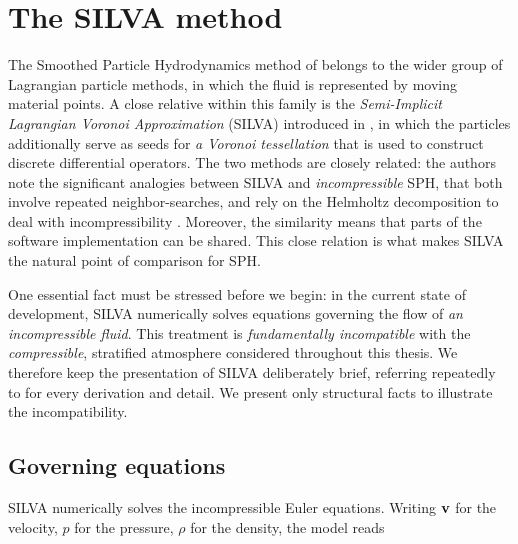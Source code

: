 \documentclass[../main.tex]{subfiles}
\begin{document}
\chapter{The SILVA method}
\label{chap:SILVA}

The Smoothed Particle Hydrodynamics method of  belongs to the wider group of Lagrangian particle methods, in which the fluid is represented by moving material points. A close relative within this family is the \emph{Semi-Implicit Lagrangian Voronoi Approximation} (SILVA) introduced in \autocite{kinclSemiimplicitLagrangianVoronoi2025}, in which the particles additionally serve as seeds for \emph{a Voronoi tessellation} that is used to construct discrete differential operators. The two methods are closely related: the authors note the significant analogies between SILVA and \emph{incompressible} SPH, \eg that both involve repeated neighbor-searches, and rely on the Helmholtz decomposition to deal with incompressibility \autocite[p.~90]{kinclSemiimplicitLagrangianVoronoi2025}. Moreover, the similarity means that parts of the software implementation can be shared. This close relation is what makes SILVA the natural point of comparison for SPH.

One essential fact must be stressed before we begin: in the current state of development, SILVA numerically solves equations governing the flow of \emph{an incompressible fluid}. This treatment is \emph{fundamentally incompatible} with the \emph{compressible}, stratified atmosphere considered throughout this thesis. We therefore keep the presentation of SILVA deliberately brief, referring repeatedly to \autocite{kinclSemiimplicitLagrangianVoronoi2025} for every derivation and detail. We present only structural facts to illustrate the incompatibility.

\section{Governing equations}
\label{sec:silva_governing}

SILVA numerically solves the incompressible Euler equations. Writing $\mathbf{v}$ for the velocity, $p$ for the pressure, $\rho$ for the density, the model reads
\end{document}
